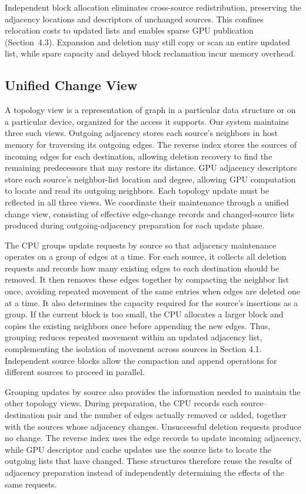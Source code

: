 Independent block allocation eliminates cross-source redistribution, preserving the adjacency locations and descriptors of unchanged sources. This confines relocation costs to updated lists and enables sparse GPU publication (Section~4.3). Expansion and deletion may still copy or scan an entire updated list, while spare capacity and delayed block reclamation incur memory overhead.

\subsection{Unified Change View}


A topology view is a representation of graph in a particular data structure or on a particular device, organized for the access it supports. Our system maintains three such views. Outgoing adjacency stores each source's neighbors in host memory for traversing its outgoing edges. The reverse index stores the sources of incoming edges for each destination, allowing deletion recovery to find the remaining predecessors that may restore its distance. GPU adjacency descriptors store each source's neighbor-list location and degree, allowing GPU computation to locate and read its outgoing neighbors. Each topology update must be reflected in all three views. We coordinate their maintenance through a unified change view, consisting of effective edge-change records and changed-source lists produced during outgoing-adjacency preparation for each update phase.

The CPU groups update requests by source so that adjacency maintenance operates on a group of edges at a time. For each source, it collects all deletion requests and records how many existing edges to each destination should be removed. It then removes these edges together by compacting the neighbor list once, avoiding repeated movement of the same entries when edges are deleted one at a time. It also determines the capacity required for the source's insertions as a group. If the current block is too small, the CPU allocates a larger block and copies the existing neighbors once before appending the new edges. Thus, grouping reduces repeated movement within an updated adjacency list, complementing the isolation of movement across sources in Section 4.1. Independent source blocks allow the compaction and append operations for different sources to proceed in parallel.

Grouping updates by source also provides the information needed to maintain the other topology views. During preparation, the CPU records each source--destination pair and the number of edges actually removed or added, together with the sources whose adjacency changes. Unsuccessful deletion requests produce no change. The reverse index uses the edge records to update incoming adjacency, while GPU descriptor and cache updates use the source lists to locate the outgoing lists that have changed. These structures therefore reuse the results of adjacency preparation instead of independently determining the effects of the same requests.

